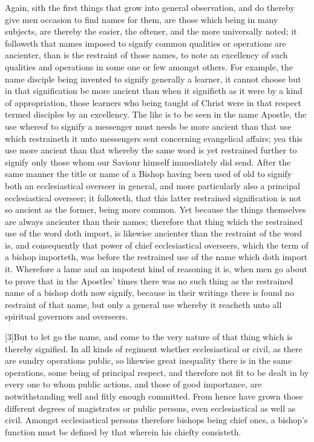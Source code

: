 Again, sith the first things that grow into general observation, and do thereby give men occasion to find names for them, are those which being in many subjects, are thereby the easier, the oftener, and the more universally noted; it followeth that names imposed to signify common qualities or operations are ancienter, than is the restraint of those names, to note an excellency of such qualities and operations in some one or few amongst others. For example, the name disciple being invented to signify generally a learner, it cannot choose but in that signification be more ancient than when it signifieth as it were by a kind of appropriation, those learners who being taught of Christ were in that respect termed disciples by an excellency. The like is to be seen in the name Apostle, the use whereof to signify a messenger must needs be more ancient than that use which restraineth it unto messengers sent concerning evangelical affairs; yea this use more ancient than that whereby the same word is yet restrained further to signify only those whom our Saviour himself immediately did send. After the same manner the title or name of a Bishop having been used of old to signify both an ecclesiastical overseer in general, and more particularly also a principal ecclesiastical overseer; it followeth, that this latter restrained signification is not so ancient as the former, being more common. Yet because the things themselves are always ancienter than their names; therefore that thing which the restrained use of the word doth import,  is likewise ancienter than the restraint of the word is,
 and consequently that power of chief ecclesiastical overseers, which the term of a bishop importeth, was before the restrained use of the name which doth import it. Wherefore a lame and an impotent kind of reasoning it is, when men go about to prove that in the Apostles’ times there was no such thing as the restrained name of a bishop doth now signify, because in their writings there is found no restraint of that name, but only a general use whereby it reacheth unto all spiritual governors and overseers.

[3]But to let go the name, and come to the very nature of that thing which is thereby signified. In all kinds of regiment whether ecclesiastical or civil, as there are sundry operations public, so likewise great inequality there is in the same operations, some being of principal respect, and therefore not fit to be dealt in by every one to whom public actions, and those of good importance, are notwithstanding well and fitly enough committed. From hence have grown those different degrees of magistrates or public persons, even ecclesiastical as well as civil. Amongst ecclesiastical persons therefore bishops being chief ones, a bishop’s function must be defined by that wherein his chiefty consisteth.

